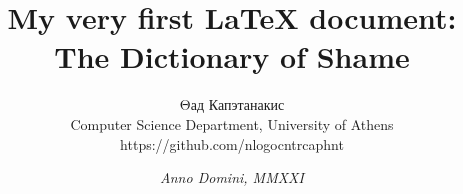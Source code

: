 \documentclass{article}
\author{Θад Капэтанакис\\ {\small Computer Science Department, University of Athens}\\ {\tiny https://github.com/nlogocntrcaphnt}}
\title{My very first {\LaTeX} document: The Dictionary of Shame}
\date{\textit{Anno Domini, MMXXI}}
\begin{document}
	\maketitle
	\renewcommand{\labelenumi}{\Roman{enumi}}
	\begin{itemize}


\end{itemize}
\end{document}
